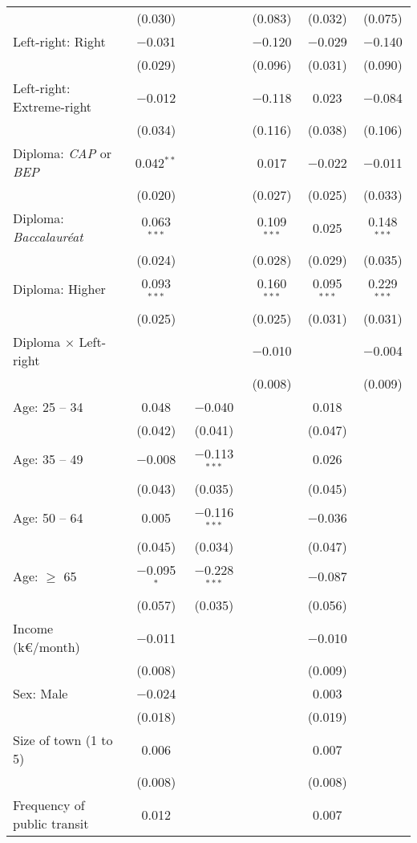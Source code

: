 \documentclass[11pt]{article}
\begin{document}
\begin{table*}[!h]
{{\begin{tabular}{@{\extracolsep{5pt}}lccccc}
  & (0.030) &  & (0.083) & (0.032) & (0.075) \\ 
  Left-right: Right & $-$0.031 &  & $-$0.120 & $-$0.029 & $-$0.140 \\ 
  & (0.029) &  & (0.096) & (0.031) & (0.090) \\ 
  Left-right: Extreme-right & $-$0.012 &  & $-$0.118 & 0.023 & $-$0.084 \\ 
  & (0.034) &  & (0.116) & (0.038) & (0.106) \\ 
  Diploma: \textit{CAP} or \textit{BEP} & 0.042$^{**}$ &  & 0.017 & $-$0.022 & $-$0.011 \\ 
  & (0.020) &  & (0.027) & (0.025) & (0.033) \\ 
  Diploma: \textit{Baccalauréat} & 0.063$^{***}$ &  & 0.109$^{***}$ & 0.025 & 0.148$^{***}$ \\ 
  & (0.024) &  & (0.028) & (0.029) & (0.035) \\ 
  Diploma: Higher & 0.093$^{***}$ &  & 0.160$^{***}$ & 0.095$^{***}$ & 0.229$^{***}$ \\ 
  & (0.025) &  & (0.025) & (0.031) & (0.031) \\ 
  Diploma $\times$ Left-right &  &  & $-$0.010 &  & $-$0.004 \\ 
  &  &  & (0.008) &  & (0.009) \\ 
  Age: 25 -- 34 & 0.048 & $-$0.040 &  & 0.018 &  \\ 
  & (0.042) & (0.041) &  & (0.047) &  \\ 
  Age: 35 -- 49 & $-$0.008 & $-$0.113$^{***}$ &  & 0.026 &  \\ 
  & (0.043) & (0.035) &  & (0.045) &  \\ 
  Age: 50 -- 64 & 0.005 & $-$0.116$^{***}$ &  & $-$0.036 &  \\ 
  & (0.045) & (0.034) &  & (0.047) &  \\ 
  Age: $\geq$ 65 & $-$0.095$^{*}$ & $-$0.228$^{***}$ &  & $-$0.087 &  \\ 
  & (0.057) & (0.035) &  & (0.056) &  \\ 
  Income (k\euro{}/month) & $-$0.011 &  &  & $-$0.010 &  \\ 
  & (0.008) &  &  & (0.009) &  \\ 
  Sex: Male & $-$0.024 &  &  & 0.003 &  \\ 
  & (0.018) &  &  & (0.019) &  \\ 
  Size of town (1 to 5) & 0.006 &  &  & 0.007 &  \\ 
  & (0.008) &  &  & (0.008) &  \\ 
  Frequency of public transit & 0.012 &  &  & 0.007 &  \\ 

\end{tabular}}}
\end{table*}
\end{document}
